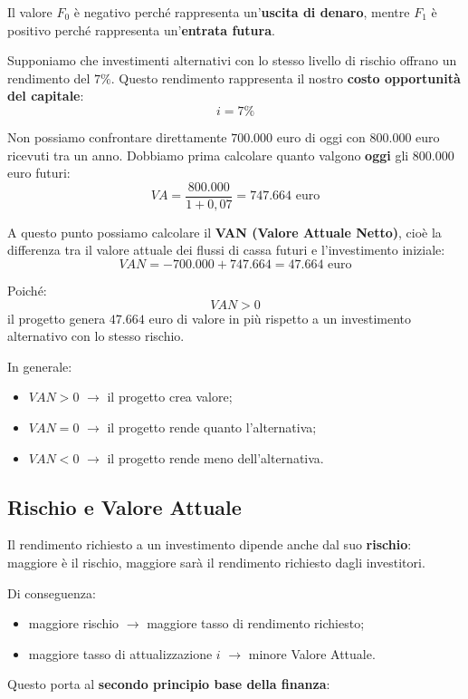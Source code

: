 \noindent Il valore \(F_0\) è negativo perché rappresenta un'\textbf{uscita di denaro}, mentre \(F_1\) è positivo perché 
rappresenta un'\textbf{entrata futura}.

\noindent Supponiamo che investimenti alternativi con lo stesso livello di rischio offrano un 
rendimento del \(7\%\). Questo rendimento rappresenta il nostro \textbf{costo opportunità del capitale}:
\[
i = 7\%
\]

\noindent Non possiamo confrontare direttamente \(700.000\) euro di oggi con \(800.000\) euro ricevuti tra un anno. 
Dobbiamo prima calcolare quanto valgono \textbf{oggi} gli \(800.000\) euro futuri:
\[
VA = \frac{800.000}{1+0{,}07} = 747.664 \text{ euro}
\]

\noindent A questo punto possiamo calcolare il \textbf{VAN (Valore Attuale Netto)}, cioè la differenza tra il valore attuale dei 
flussi di cassa futuri e l'investimento iniziale:
\[
VAN = -700.000 + 747.664 = 47.664 \text{ euro}
\]

\noindent Poiché:
\[
VAN > 0
\]
il progetto genera \(47.664\) euro di valore in più rispetto a un investimento alternativo con lo stesso rischio.

\noindent In generale:
\begin{itemize}
    \item \(VAN > 0\) $\rightarrow$ il progetto crea valore;
    \item \(VAN = 0\) $\rightarrow$ il progetto rende quanto l'alternativa;
    \item \(VAN < 0\) $\rightarrow$ il progetto rende meno dell'alternativa.
\end{itemize}
\subsection{Rischio e Valore Attuale}
Il rendimento richiesto a un investimento dipende anche dal suo \textbf{rischio}: maggiore è il rischio, maggiore sarà il 
rendimento richiesto dagli investitori.

\noindent Di conseguenza:
\begin{itemize}
    \item maggiore rischio $\rightarrow$ maggiore tasso di rendimento richiesto;
    \item maggiore tasso di attualizzazione \(i\) $\rightarrow$ minore Valore Attuale.
\end{itemize}

\noindent Questo porta al \textbf{secondo principio base della finanza}:

